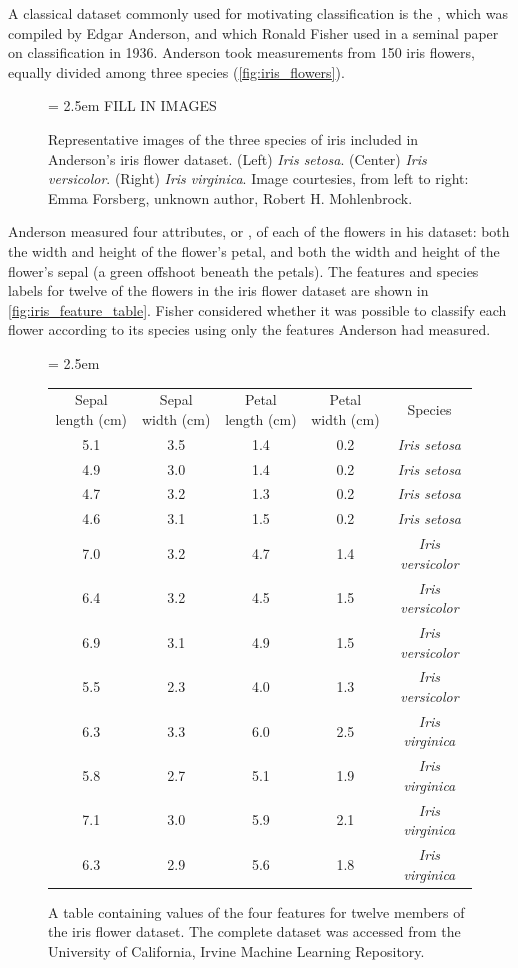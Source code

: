 A classical dataset commonly used for motivating classification is the , which was compiled by Edgar Anderson, and which Ronald Fisher used in a seminal paper on classification in 1936. Anderson took measurements from 150 iris flowers, equally divided among three species (\autoref{fig:iris_flowers}).\\

\begin{figure}[h]
\centering
\tabcolsep = 2.5em
\mySfFamily
 FILL IN IMAGES

\caption{Representative images of the three species of iris included in Anderson's iris flower dataset. (Left) \textit{Iris setosa}. (Center)  \textit{Iris versicolor}. (Right) \textit{Iris virginica}. Image courtesies, from left to right: Emma Forsberg, unknown author, Robert H. Mohlenbrock.}
\label{fig:iris_flowers}
\end{figure}

Anderson measured four attributes, or , of each of the flowers in his dataset: both the width and height of the flower's petal, and both the width and height of the flower's sepal (a green offshoot beneath the petals). The features and species labels for twelve of the flowers in the iris flower dataset are shown in \autoref{fig:iris_feature_table}. Fisher considered whether it was possible to classify each flower according to its species using only the features Anderson had measured.\\

\begin{figure}[h]
\centering
\tabcolsep = 2.5em
\mySfFamily
\begin{tabular}{c c c c c}
Sepal length (cm) & Sepal width (cm) & Petal length (cm) & Petal width (cm) & Species \\
5.1 & 3.5 & 1.4 & 0.2 & \textit{Iris setosa} \\
4.9 & 3.0 & 1.4 & 0.2 & \textit{Iris setosa} \\
4.7 & 3.2 & 1.3 & 0.2 & \textit{Iris setosa} \\
4.6 & 3.1 & 1.5 & 0.2 & \textit{Iris setosa} \\
7.0 & 3.2 & 4.7 & 1.4 & \textit{Iris versicolor} \\
6.4 & 3.2 & 4.5 & 1.5 & \textit{Iris versicolor} \\
6.9 & 3.1 & 4.9 & 1.5 & \textit{Iris versicolor} \\
5.5 & 2.3 & 4.0 & 1.3 & \textit{Iris versicolor} \\
6.3 & 3.3 & 6.0 & 2.5 & \textit{Iris virginica} \\
5.8 & 2.7 & 5.1 & 1.9 & \textit{Iris virginica} \\
7.1 & 3.0 & 5.9 & 2.1 & \textit{Iris virginica} \\
6.3 & 2.9 & 5.6 & 1.8 & \textit{Iris virginica} \\
\end{tabular}
\caption{A table containing values of the four features for twelve members of the iris flower dataset. The complete dataset was accessed from the University of California, Irvine Machine Learning Repository.}
\label{fig:iris_feature_table}
\end{figure}

